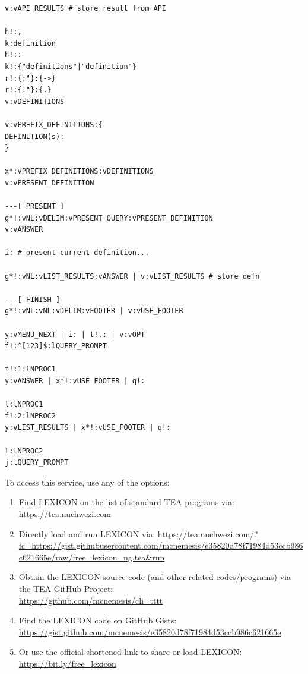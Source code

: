 \documentclass[a4paper, 18pt]{book} %
\begin{document}
{{{\begin{tcolorbox}[teaterminalstyle, title=TEA Application: Free Dictionary | LEXICON v3, breakable]
\begin{lstlisting}[language=TEA,breaklines=true,]
v:vAPI_RESULTS # store result from API

h!:,
k:definition
h!::
k!:{"definitions"|"definition"}
r!:{:"}:{->}
r!:{."}:{.}
v:vDEFINITIONS

v:vPREFIX_DEFINITIONS:{
DEFINITION(s):
}

x*:vPREFIX_DEFINITIONS:vDEFINITIONS 
v:vPRESENT_DEFINITION

---[ PRESENT ]
g*!:vNL:vDELIM:vPRESENT_QUERY:vPRESENT_DEFINITION
v:vANSWER

i: # present current definition...

g*!:vNL:vLIST_RESULTS:vANSWER | v:vLIST_RESULTS # store defn

---[ FINISH ]
g*!:vNL:vNL:vDELIM:vFOOTER | v:vUSE_FOOTER

y:vMENU_NEXT | i: | t!.: | v:vOPT
f!:^[123]$:lQUERY_PROMPT

f!:1:lNPROC1
y:vANSWER | x*!:vUSE_FOOTER | q!:

l:lNPROC1
f!:2:lNPROC2
y:vLIST_RESULTS | x*!:vUSE_FOOTER | q!:

l:lNPROC2
j:lQUERY_PROMPT
   \end{lstlisting}
  \end{tcolorbox}
  \label{FIGTEALEXICONv2}

\vspace{1em}


\vspace{2em}

To access this service, use any of the options:

\vspace{2em}

\begin{enumerate}
\item Find LEXICON on the list of standard TEA programs via:\\ \url{https://tea.nuchwezi.com}
\item Directly load and run LEXICON via: {\normalsize \url{https://tea.nuchwezi.com/?fc=https://gist.githubusercontent.com/mcnemesis/e35820d78f71984d53ccb986c621665e/raw/free_lexicon_ng.tea&run} }
\item{Obtain the LEXICON source-code (and other related codes/programs) via the TEA GitHub Project:\\
\url{https://github.com/mcnemesis/cli_tttt}}
\item{ Find the LEXICON code on GitHub Gists:\\
\url{https://gist.github.com/mcnemesis/e35820d78f71984d53ccb986c621665e}}
\item{ Or use the official shortened link to share or load LEXICON:\\
 \url{https://bit.ly/free_lexicon}
 }
\end{enumerate}

}}}
\end{document}
